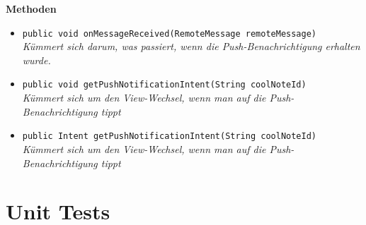 \documentclass[a4paper]{scrreprt}
\begin{document}
\textbf{Methoden}
\begin{itemize}
	\item{\texttt{public void onMessageReceived(RemoteMessage remoteMessage)}}\\
	\textit{Kümmert sich darum, was passiert, wenn die Push-Benachrichtigung erhalten wurde.}\\
	\item{\texttt{public void getPushNotificationIntent(String coolNoteId)}}\\
	\textit{Kümmert sich um den View-Wechsel, wenn man auf die Push-Benachrichtigung tippt}\\
	\item{\texttt{public Intent getPushNotificationIntent(String coolNoteId)}}\\
	\textit{Kümmert sich um den View-Wechsel, wenn man auf die Push-Benachrichtigung tippt}\\
\end{itemize}

		\chapter{Unit Tests}
		
\end{document}

